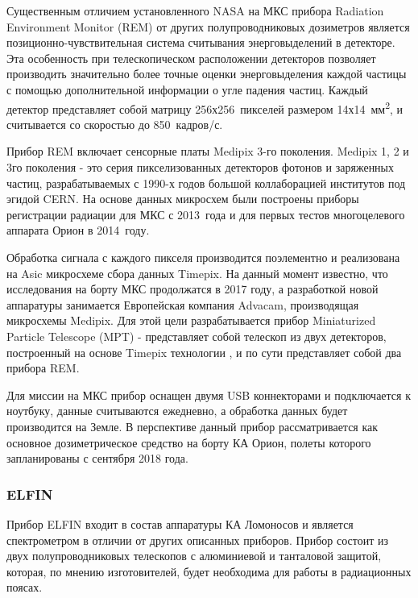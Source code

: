 Существенным отличием установленного NASA на МКС прибора Radiation Environment Monitor (REM) от других полупроводниковых дозиметров является позиционно-чувствительная система считывания энерговыделений в детекторе. Эта особенность при телескопическом расположении детекторов позволяет производить значительно более точные оценки энерговыделения каждой частицы с помощью дополнительной информации о угле падения частиц. Каждый детектор представляет собой матрицу 256х256~пикселей размером 14х14~мм\textsuperscript{2}, и считывается со скоростью до 850~кадров/с.

Прибор REM включает сенсорные платы Medipix 3-го поколения. Medipix 1, 2 и 3го поколения - это серия пикселизованных детекторов фотонов и заряженных частиц, разрабатываемых с 1990-х годов большой коллаборацией институтов под эгидой CERN. На основе данных микросхем были построены приборы регистрации радиации для МКС с 2013~года и для первых тестов многоцелевого аппарата Орион в 2014~году.

Обработка сигнала с каждого пикселя производится поэлементно и реализована на Asic микросхеме сбора данных Timepix. На данный момент известно, что исследования на борту МКС продолжатся в 2017 году, а разработкой новой аппаратуры занимается Европейская компания Advacam, производящая микросхемы Medipix. Для этой цели разрабатывается прибор Miniaturized Particle Telescope (MPT)\cite{Fry2016} - представляет собой телескоп из двух детекторов, построенный на основе Timepix технологии \cite{Kroupa2015}, и по сути представляет собой два прибора REM. 

Для миссии на МКС прибор оснащен двумя USB коннекторами и подключается к ноутбуку, данные считываются ежедневно, а обработка данных будет производится на Земле. В перспективе данный прибор рассматривается как основное дозиметрическое средство на борту КА Орион, полеты которого запланированы с сентября 2018 года.


\subsubsection{ELFIN}
Прибор ELFIN входит в состав аппаратуры КА Ломоносов и является спектрометром в отличии от других описанных приборов. Прибор состоит из двух полупроводниковых телескопов с алюминиевой и танталовой защитой, которая, по мнению изготовителей, будет необходима для работы в радиационных поясах\cite{VassilisAngelopoulos}.

